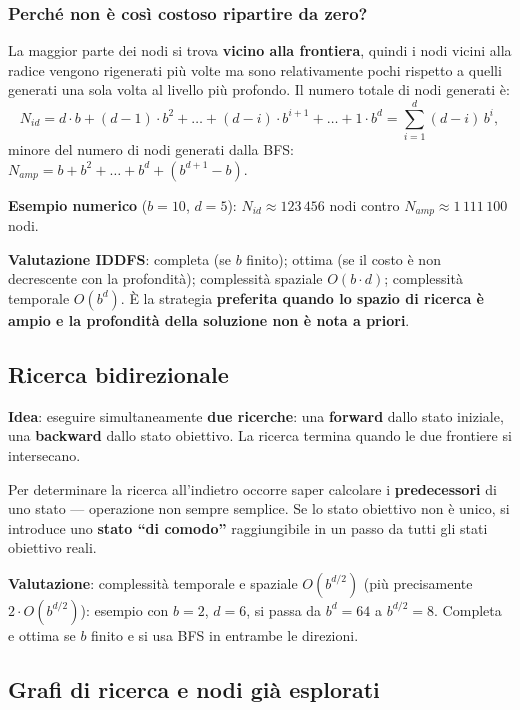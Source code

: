 \documentclass[11pt,a4paper]{report}
\begin{document}
\subsubsection*{Perché non è così costoso ripartire da zero?}

La maggior parte dei nodi si trova \textbf{vicino alla frontiera}, quindi i nodi vicini alla radice vengono rigenerati più volte ma sono relativamente pochi rispetto a quelli generati una sola volta al livello più profondo. Il numero totale di nodi generati è:
\[
N_{id} = d\cdot b + (d-1)\cdot b^2 + \dots + (d-i)\cdot b^{i+1} + \dots + 1\cdot b^d = \sum_{i=1}^{d}(d-i)\,b^i,
\]
minore del numero di nodi generati dalla BFS: $N_{amp} = b + b^2 + \dots + b^d + (b^{d+1}-b)$.

\textbf{Esempio numerico} ($b=10$, $d=5$): $N_{id} \approx 123\,456$ nodi contro $N_{amp} \approx 1\,111\,100$ nodi.

\textbf{Valutazione IDDFS}: completa (se $b$ finito); ottima (se il costo è non decrescente con la profondità); complessità spaziale $O(b\cdot d)$; complessità temporale $O(b^d)$. È la strategia \textbf{preferita quando lo spazio di ricerca è ampio e la profondità della soluzione non è nota a priori}.

\subsection{Ricerca bidirezionale}

\textbf{Idea}: eseguire simultaneamente \textbf{due ricerche}: una \textbf{forward} dallo stato iniziale, una \textbf{backward} dallo stato obiettivo. La ricerca termina quando le due frontiere si intersecano.

Per determinare la ricerca all'indietro occorre saper calcolare i \textbf{predecessori} di uno stato --- operazione non sempre semplice. Se lo stato obiettivo non è unico, si introduce uno \textbf{stato ``di comodo''} raggiungibile in un passo da tutti gli stati obiettivo reali.

\textbf{Valutazione}: complessità temporale e spaziale $O(b^{d/2})$ (più precisamente $2\cdot O(b^{d/2})$): esempio con $b=2$, $d=6$, si passa da $b^d=64$ a $b^{d/2}=8$. Completa e ottima se $b$ finito e si usa BFS in entrambe le direzioni.

\subsection{Grafi di ricerca e nodi già esplorati}
\end{document}
